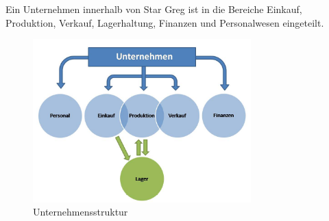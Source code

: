 Ein Unternehmen innerhalb von Star Greg ist in die Bereiche Einkauf, Produktion, Verkauf, Lagerhaltung, Finanzen und Personalwesen eingeteilt. 

\begin{figure}[htbp]
\centering
\includegraphics[width=0.75\textwidth]{20_Spielwelt/20_Unternehmen/Unternehmensstruktur.jpg}
\caption{Unternehmensstruktur}
\end{figure}

